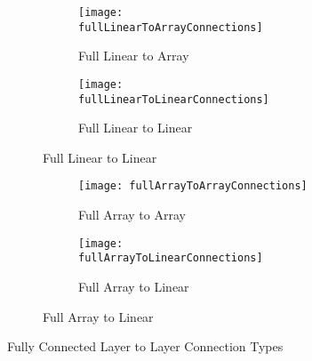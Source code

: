 \begin{figure}[h]
  \centering
  \begin{subfigure}{1.0\textwidth}
    \centering
    \begin{subfigure}{.5\textwidth}
      \centering
      \texttt{[image: fullLinearToArrayConnections]}
      \captionsetup{width=.8\textwidth, justification=centering, skip=10pt}
      \caption{Full Linear to Array}
      \label{fig:Full Linear to Array}
    \end{subfigure}%
    \begin{subfigure}{.5\textwidth}
      \centering
      \texttt{[image: fullLinearToLinearConnections]}
      \captionsetup{width=.8\textwidth, justification=centering, skip=10pt}
      \caption{Full Linear to Linear}
      \label{fig:Full Linear to Linear}
    \end{subfigure}
  \end{subfigure}

  \bigskip

  \begin{subfigure}{1.0\textwidth}
    \centering
    \begin{subfigure}{.5\textwidth}
      \centering
      \texttt{[image: fullArrayToArrayConnections]}
      \captionsetup{width=.8\textwidth, justification=centering, skip=10pt}
      \caption{Full Array to Array}
      \label{fig:Full Array to Array}
    \end{subfigure}%
    \begin{subfigure}{.5\textwidth}
      \centering
      \texttt{[image: fullArrayToLinearConnections]}
      \captionsetup{width=.8\textwidth, justification=centering, skip=10pt}
      \caption{Full Array to Linear}
      \label{fig:Full Array to Linear}
    \end{subfigure}
  \end{subfigure}

\captionsetup{justification=centering, skip=10pt}
\caption{Fully Connected Layer to Layer Connection Types}
\label{fig:Fully Connected Layer to Layer Connection Types}
\end{figure}

